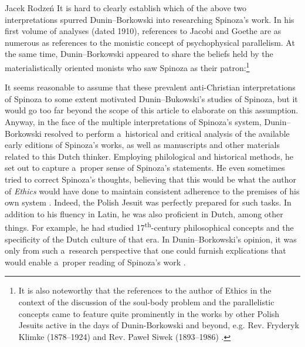 \begin{artengenv}{Jacek Rodzeń}
It is hard to clearly establish which of the above two interpretations spurred Dunin–Borkowski into researching Spinoza's work. In his first volume of analyses (dated 1910), references to Jacobi and Goethe are as numerous as references to the monistic concept of psychophysical parallelism. At the same time, Dunin–Borkowski appeared to share the beliefs held by the materialistically oriented monists who saw Spinoza as their patron:\footnote{It is also noteworthy that the references to the author of Ethics in the context of the discussion of the soul-body problem and the parallelistic concepts came to feature quite prominently in the works by other Polish Jesuits active in the days of Dunin-Borkowski and beyond, e.g. Rev. Fryderyk Klimke (1878--1924) and Rev. Paweł Siwek (1893--1986)
\parencites*[cf.][pp.6]{klimke_teorya_1906}[][pp.312–332]{klimke_monismus_1911}[][pp.1310–1314]{bremer_philosophy_2020}.%
}


It seems reasonable to assume that these prevalent anti-Christian interpretations of Spinoza to some extent motivated Dunin–Bukowski's studies of Spinoza, but it would go too far beyond the scope of this article to elaborate on this assumption. Anyway, in the face of the multiple interpretations of Spinoza's system, Dunin–Borkowski resolved to perform a~historical and critical analysis of the available early editions of Spinoza's works, as well as manuscripts and other materials related to this Dutch thinker. Employing philological and historical methods, he set out to capture a~proper sense of Spinoza's statements. He even sometimes tried to correct Spinoza's thoughts, believing that this would be what the author of \textit{Ethics} would have done to maintain consistent adherence to the premises of his own system
\parencite[][p.308]{siwek_spinoza_1938}. %
 Indeed, the Polish Jesuit was perfectly prepared for such tasks. In addition to his fluency in Latin, he was also proficient in Dutch, among other things. For example, he had studied 17\textsuperscript{th}-century philosophical concepts and the specificity of the Dutch culture of that era. In Dunin–Borkowski's opinion, it was only from such a~research perspective that one could furnish explications that would enable a~proper reading of Spinoza's work 
\parencite[][p.XI–XXIII]{dunin-borkowski_junge_1910}.%



\end{artengenv}
